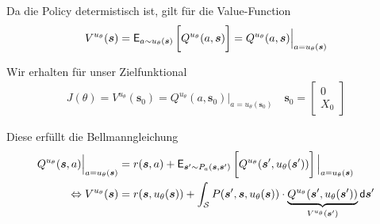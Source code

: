 \documentclass[a4paper, 12pt]{scrartcl}
\begin{document}
\begin{beweis}
    Da die Policy determistisch ist, gilt für die Value-Function
    \begin{align*}
        V^{u_\theta}(\bm{s}) = 
        \mathsf{E}_{a \sim u_\theta (\bm{s})}
        \left[
            \vphantom{\int}
            Q^{u_\theta}(a,\bm{s})
        \right]
        =
        Q^{u_\theta}(a,\bm{s}) \Big|_{a = u_\theta (\bm{s})}
    \end{align*}

    Wir erhalten für unser Zielfunktional
    \begin{align*}
        J(\theta) 
        = V^{u_\theta}(\bm{s}_0) 
        = Q^{u_\theta}(a,\bm{s}_0) \Big|_{a = u_\theta (\bm{s}_0)}
        \quad
        \bm{s}_0
        =
        \begin{bmatrix}
            0 \\ X_0
        \end{bmatrix}
    \end{align*}

    Diese erfüllt die Bellmanngleichung 
    \begin{align*}
        Q^{u_\theta}(\bm{s},a) \Big|_{a = u_\theta (\bm{s})}
        &=
        r(\bm{s},a) + 
        \mathsf{E}_{\bm{s}' \sim P_{a}(\bm{s}, \bm{s}')}
        \left[
            \vphantom{\int}
            Q^{u_\theta}(\bm{s}' , u_\theta (\bm{s}'))
        \right]
        \Big|_{a = u_\theta (\bm{s})}
        \\
        \Leftrightarrow
        V^{u_\theta}(\bm{s})
        &=
        r(\bm{s},u_\theta (\bm{s})) 
        + 
        \int_{\mathcal{S}} P(\bm{s}', \bm{s}, u_\theta (\bm{s})) 
        \cdot
        \underbrace{
            Q^{u_\theta}(\bm{s}' , u_\theta (\bm{s}'))
        }_{V^{u_\theta}(\bm{s}')}
        \mathsf{d}\bm{s}'
    \end{align*}


\end{beweis}
\end{document}

